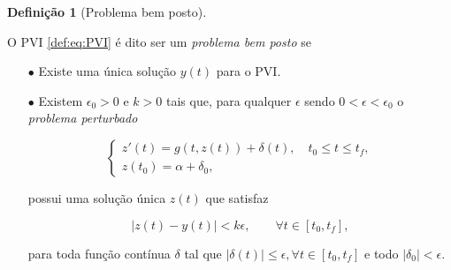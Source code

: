 \documentclass{beamer}
\theoremstyle{plain}
\theoremstyle{definition}
\newtheorem{defi}{Definição}
\begin{document}
\begin{frame}
    \footnotesize 
    \begin{defi}[Problema bem posto]
         \label{def:3:problema_bem_posto}
            
         O PVI \eqref{def:eq:PVI} é dito ser um \textit{problema bem posto} se 
         \begin{itemize}
             \item[$\bullet$] Existe uma única solução $y(t)$ para o PVI.
         \item[$\bullet$] Existem  $\epsilon_0 > 0$ e $k>0$ tais que, para qualquer $\epsilon $ sendo $0 < \epsilon < \epsilon_0$ o \textit{problema perturbado}


         \begin{equation*}
             \begin{cases}
                 z'(t) = g(t, z(t))+\delta(t), \quad  t_0 \leq t \leq t_f, \\
                 z(t_0)=\alpha+\delta_0,
             \end{cases}
         \end{equation*}

         possui uma solução única $z(t)$ que satisfaz

         \begin{equation*}
             |z(t)-y(t)|<k \epsilon, \qquad \forall t \in [t_0, t_f],
         \end{equation*} 
        
         para toda função contínua $\delta$ tal que $|\delta(t)| \leq \epsilon, \forall t \in [t_0, t_f]$ e todo $|\delta_0| < \epsilon$.
         \end{itemize}

     \end{defi}
\end{frame}

\end{document}
